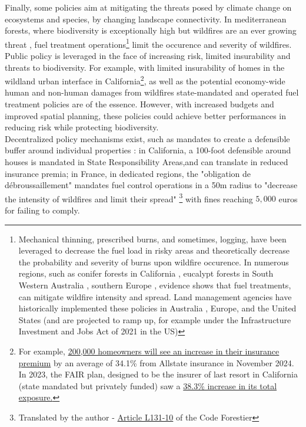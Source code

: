 Finally, some policies aim at mitigating the threats posed by climate change on ecosystems and species, by changing landscape connectivity. In mediterranean forests, where biodiversity is exceptionally high but wildfires are an ever growing threat \citep{Dupuy2019ClimateCI, wasserman_climate_2023}, fuel treatment operations\footnote{Mechanical thinning, prescribed burns, and sometimes, logging, have been leveraged to decrease the fuel load in risky areas and theoretically decrease the probability and severity of burns upon wildfire occurence. In numerous regions, such as conifer forests in California \citep{Vaillant2009, Kalies2016, low_shaded_2023}, eucalypt forests in South Western Australia \citep{burrows2013, boer_long-term_2009, Florec2020}, southern Europe \citep{Fernandes2013}, evidence shows that fuel treatments, can mitigate wildfire intensity and spread. Land management agencies have historically implemented these policies in Australia \citep{burrows2013}, Europe, and the United States (and are projected to ramp up, for example under the Infrastructure Investment and Jobs Act of 2021 in the US)} limit the occurence and severity of wildfires. Public policy is leveraged in the face of increasing risk, limited insurability and threats to biodiversity. For example, with limited insurability of homes in the wildland urban interface in California\footnote{For example, \href{https://www.washingtonpost.com/climate-environment/2024/08/29/california-insurance-wildfires-allstate/}{200,000 homeowners will see an increase in their insurance premium} by an average of 34.1\% from Allstate insurance in November 2024. In 2023, the FAIR plan, designed to be the insurer of last resort in California (state mandated but privately funded) saw a \href{https://www.cfpnet.com/key-statistics-data/}{38.3\% increase in its total exposure.}}, as well as the potential economy-wide human and non-human damages from wildfires \citep{wang_economic_2021, heft-neal_behavior_2023, Ayars2023} state-mandated and operated fuel treatment policies are of the essence. However, with increased budgets and improved spatial planning, these policies could achieve better performances in reducing risk while protecting biodiversity.\\
Decentralized policy mechanisms exist, such as mandates to create a defensible buffer around individual properties : in California, a 100-foot defensible around houses is mandated in State Responsibility Areas,and can translate in reduced insurance premia;  in France, in dedicated regions, the "obligation de débroussaillement" mandates fuel control operations in a 50m radius to "decrease the intensity of wildfires and limit their spread"
\footnote{Translated by the author - \href{https://www.legifrance.gouv.fr/codes/article_lc/LEGIARTI000047809197}{Article L131-10} of the Code Forestier} with fines reaching $5,000$ euros for failing to comply.


